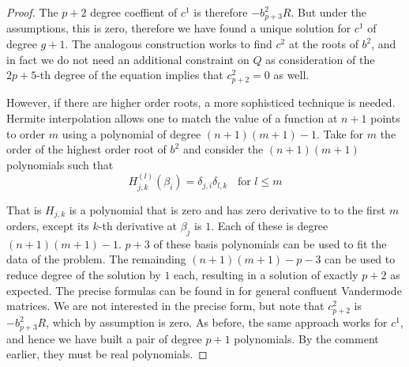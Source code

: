\begin{lem}
\begin{proof}
The $p+2$ degree coeffient of $c^1$ is therefore $-b^2_{p+3}R$. But under the assumptions, this is zero, therefore we have found a unique solution for $c^1$ of degree $g+1$. The analogous construction works to find $c^2$ at the roots of $b^2$, and in fact we do not need an additional constraint on $Q$ as consideration of the $2p+5$-th degree of the equation implies that $c^2_{p+2}=0$ as well.

However, if there are higher order roots, a more sophisticed technique is needed. Hermite interpolation allows one to match the value of a function at $n+1$ points to order $m$ using a polynomial of degree $(n+1)(m+1)-1$. Take for $m$ the order of the highest order root of $b^2$ and consider the $(n+1)(m+1)$ polynomials such that
\[
H_{j,k}^{(l)}(β_i) = δ_{j,i}δ_{l,k}\;\;\text{ for }  l \leq m
\]

That is $H_{j,k}$ is a polynomial that is zero and has zero derivative to to the first $m$ orders, except its $k$-th derivative at $β_j$ is $1$. Each of these is degree $(n+1)(m+1)-1$. $p+3$ of these basis polynomials can be used to fit the data of the problem. The remainding $(n+1)(m+1)-p-3$ can be used to reduce degree of the solution by $1$ each, resulting in a solution of exactly $p+2$ as expected. The precise formulas can be found in  \cite{Spitzbart1960} for general confluent Vandermode matrices. We are not interested in the precise form, but note that $c^2_{p+2}$ is $-b^2_{p+3}R$, which by assumption is zero. As before, the same approach works for $c^1$, and hence we have built a pair of degree $p+1$ polynomials. By the comment earlier, they must be real polynomials.

\end{proof}
\end{lem}












